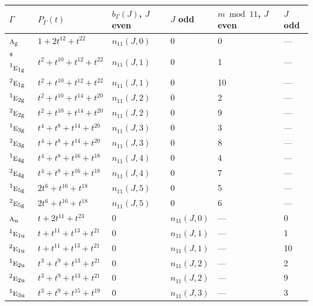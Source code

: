 \documentclass[10pt,a4paper]{article}
\numberwithin{equation}{section}
\newcommand{\irr}[1]{\text{\normalfont\scshape #1}}
\newcommand{\conjpair}[1]{{}^{#1}}
\newcommand{\ptag}[1]{\mathrm{#1}}
\begin{document}
{\small\begin{longtable}{@{}llllll@{}}\toprule
$\Gamma$ & $P_\Gamma(t)$ & $b_\Gamma(J)$, $J$ even & $J$ odd & $m \bmod 11$, $J$ even & $J$ odd\\\midrule\endhead
\bottomrule\endfoot\endlastfoot
$\irr{a}_{\ptag{g}}$ & $1 + 2t^{12} + t^{22}$ & $n_{11}(J,0)$ & $0$ & 0 & ---\\*
$\conjpair{1}\irr{e}_{1\ptag{g}}$ & $t^{2} + t^{10} + t^{12} + t^{22}$ & $n_{11}(J,1)$ & $0$ & 1 & ---\\
$\conjpair{2}\irr{e}_{1\ptag{g}}$ & $t^{2} + t^{10} + t^{12} + t^{22}$ & $n_{11}(J,1)$ & $0$ & 10 & ---\\
$\conjpair{1}\irr{e}_{2\ptag{g}}$ & $t^{2} + t^{10} + t^{14} + t^{20}$ & $n_{11}(J,2)$ & $0$ & 2 & ---\\
$\conjpair{2}\irr{e}_{2\ptag{g}}$ & $t^{2} + t^{10} + t^{14} + t^{20}$ & $n_{11}(J,2)$ & $0$ & 9 & ---\\
$\conjpair{1}\irr{e}_{3\ptag{g}}$ & $t^{4} + t^{8} + t^{14} + t^{20}$ & $n_{11}(J,3)$ & $0$ & 3 & ---\\
$\conjpair{2}\irr{e}_{3\ptag{g}}$ & $t^{4} + t^{8} + t^{14} + t^{20}$ & $n_{11}(J,3)$ & $0$ & 8 & ---\\
$\conjpair{1}\irr{e}_{4\ptag{g}}$ & $t^{4} + t^{8} + t^{16} + t^{18}$ & $n_{11}(J,4)$ & $0$ & 4 & ---\\
$\conjpair{2}\irr{e}_{4\ptag{g}}$ & $t^{4} + t^{8} + t^{16} + t^{18}$ & $n_{11}(J,4)$ & $0$ & 7 & ---\\
$\conjpair{1}\irr{e}_{5\ptag{g}}$ & $2t^{6} + t^{16} + t^{18}$ & $n_{11}(J,5)$ & $0$ & 5 & ---\\
$\conjpair{2}\irr{e}_{5\ptag{g}}$ & $2t^{6} + t^{16} + t^{18}$ & $n_{11}(J,5)$ & $0$ & 6 & ---\\
$\irr{a}_{\ptag{u}}$ & $t + 2t^{11} + t^{23}$ & $0$ & $n_{11}(J,0)$ & --- & 0\\
$\conjpair{1}\irr{e}_{1\ptag{u}}$ & $t + t^{11} + t^{13} + t^{21}$ & $0$ & $n_{11}(J,1)$ & --- & 1\\
$\conjpair{2}\irr{e}_{1\ptag{u}}$ & $t + t^{11} + t^{13} + t^{21}$ & $0$ & $n_{11}(J,1)$ & --- & 10\\
$\conjpair{1}\irr{e}_{2\ptag{u}}$ & $t^{3} + t^{9} + t^{13} + t^{21}$ & $0$ & $n_{11}(J,2)$ & --- & 2\\
$\conjpair{2}\irr{e}_{2\ptag{u}}$ & $t^{3} + t^{9} + t^{13} + t^{21}$ & $0$ & $n_{11}(J,2)$ & --- & 9\\
$\conjpair{1}\irr{e}_{3\ptag{u}}$ & $t^{3} + t^{9} + t^{15} + t^{19}$ & $0$ & $n_{11}(J,3)$ & --- & 3\\

\end{longtable}}
\end{document}
